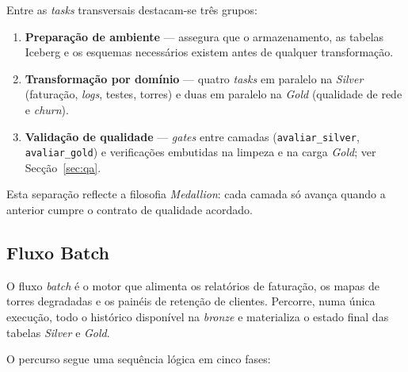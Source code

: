 \documentclass[runningheads]{llncs}
\begin{document}
Entre as \textit{tasks} transversais destacam-se três grupos:

\begin{enumerate}
    \item \textbf{Preparação de ambiente} --- assegura que o armazenamento, as tabelas Iceberg e os esquemas necessários existem antes de qualquer transformação.
    \item \textbf{Transformação por domínio} --- quatro \textit{tasks} em paralelo na \textit{Silver} (faturação, \textit{logs}, testes, torres) e duas em paralelo na \textit{Gold} (qualidade de rede e \textit{churn}).
    \item \textbf{Validação de qualidade} --- \textit{gates} entre camadas (\texttt{avaliar\_silver}, \texttt{avaliar\_gold}) e verificações embutidas na limpeza e na carga \textit{Gold}; ver Secção~\ref{sec:qa}.
\end{enumerate}

Esta separação reflecte a filosofia \textit{Medallion}: cada camada só avança quando a anterior cumpre o contrato de qualidade acordado.


\subsection{Fluxo Batch}

O fluxo \textit{batch} é o motor que alimenta os relatórios de faturação, os mapas de torres degradadas e os painéis de retenção de clientes. Percorre, numa única execução, todo o histórico disponível na \textit{bronze} e materializa o estado final das tabelas \textit{Silver} e \textit{Gold}.

O percurso segue uma sequência lógica em cinco fases:
\end{document}
